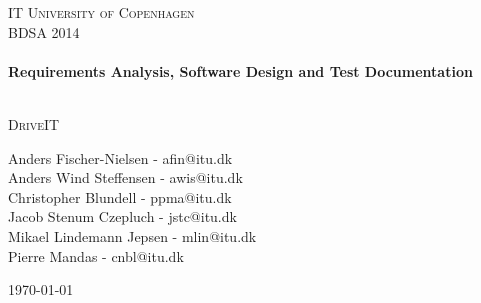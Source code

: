 


%


\begin{center}
\thispagestyle{empty}


\textsc{\LARGE IT University of Copenhagen}\\[1.5cm]

\textsc{\Large BDSA 2014 }\\[0.5cm]

\HRule \\[0.4cm]
{ \huge \bfseries Requirements Analysis, Software Design and Test Documentation \\ [0.4cm]
    }

\HRule \\[1cm]

\textsc{\Large DriveIT}\\[1.5cm]

\begin{minipage}{1\textwidth}
\begin{center} \large
Anders Fischer-Nielsen - afin@itu.dk\\
Anders Wind Steffensen - awis@itu.dk\\
Christopher Blundell - ppma@itu.dk\\
Jacob Stenum Czepluch - jstc@itu.dk\\
Mikael Lindemann Jepsen - mlin@itu.dk\\
Pierre Mandas - cnbl@itu.dk\\
\end{center}
\end{minipage}


\vfill

{\large \today}

\end{center}

\frontmatter%

%
%


\tableofcontents
\newpage
\listoffigures
\newpage

\mainmatter%











